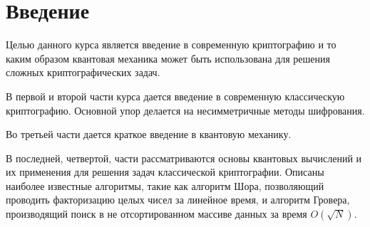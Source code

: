 \chapter*{Введение}
Целью данного курса является введение в современную криптографию и то
каким образом квантовая механика может быть использована для решения
сложных криптографических задач.

В первой и второй части курса дается введение в современную классическую
криптографию. Основной упор делается на несимметричные методы
шифрования.

Во третьей части дается краткое введение в квантовую механику.

В последней, четвертой, части рассматриваются основы квантовых вычислений и их
применения для решения задач классической криптографии. Описаны
наиболее известные алгоритмы, такие как алгоритм Шора, позволяющий
проводить факторизацию целых чисел за линейное время, и алгоритм
Гровера, производящий поиск в не отсортированном массиве данных за
время $O\left(\sqrt{N}\right)$.
